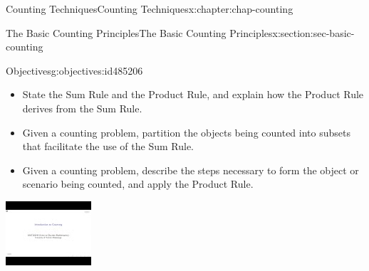 \documentclass[oneside,10pt,]{book}
\numberwithin{equation}{section}
\newlength{\qrsize}
\newlength{\previewwidth}
\begin{document}
\begin{chapterptx}{Counting Techniques}{}{Counting Techniques}{}{}{x:chapter:chap-counting}
%
%
\typeout{************************************************}
\typeout{************************************************}
%
\begin{sectionptx}{The Basic Counting Principles}{}{The Basic Counting Principles}{}{}{x:section:sec-basic-counting}
\begin{objectives}{Objectives}{g:objectives:id485206}
%
\begin{itemize}[label=\textbullet]
\item{}State the Sum Rule and the Product Rule, and explain how the Product Rule derives from the Sum Rule.%
\item{}Given a counting problem, partition the objects being counted into subsets that facilitate the use of the Sum Rule.%
\item{}Given a counting problem, describe the steps necessary to form the object or scenario being counted, and apply the Product Rule.%
\end{itemize}
\end{objectives}
\begin{sidebyside}{1}{0}{0}{0}%
\begin{sbspanel}{1}%
\setlength{\qrsize}{9em}
\setlength{\previewwidth}{\linewidth}
\addtolength{\previewwidth}{-\qrsize}
\begin{tcbraster}[raster columns=2, raster column skip=1pt, raster halign=center, raster force size=false, raster left skip=0pt, raster right skip=0pt]%
\begin{tcolorbox}[previewstyle, width=\previewwidth]%
\includegraphics[width=0.80\linewidth,height=\qrsize,keepaspectratio]{images/video-intro-to-counting.jpg}%

\end{tcolorbox}
\end{tcbraster}
\end{sbspanel}
\end{sidebyside}
\end{sectionptx}
\end{chapterptx}
\end{document}
